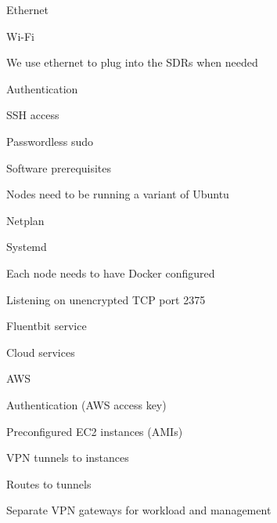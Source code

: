 \begin{outline}
\begin{outline}
\begin{outline}
\begin{outline}
                \begin{outline}
                    \item Ethernet
                    \item Wi-Fi
                    \item We use ethernet to plug into the SDRs when needed
                \end{outline}
                \item Authentication
                \begin{outline}
                    \item SSH access
                    \item Passwordless sudo
                \end{outline}
                \item Software prerequisites
                \begin{outline}
                    \item Nodes need to be running a variant of Ubuntu
                    \begin{outline}
                        \item Netplan
                        \item Systemd
                    \end{outline}
                    \item Each node needs to have Docker configured
                    \begin{outline}
                        \item Listening on unencrypted TCP port 2375
                    \end{outline}
                \end{outline}
                \item Fluentbit service
                \item Cloud services
                \begin{outline}
                    \item AWS
                    \item Authentication (AWS access key)
                    \item Preconfigured EC2 instances (AMIs)
                    \item VPN tunnels to instances
                    \item Routes to tunnels
                    \item Separate VPN gateways for workload and management
                \end{outline}

\end{outline}
\end{outline}
\end{outline}
\end{outline}
